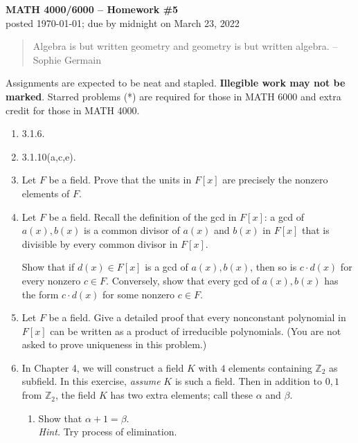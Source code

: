 \documentclass[11pt]{article}
\def\Z{\mathbb{Z}}
\theoremstyle{plain}
\theoremstyle{remark}
\begin{document}
\thispagestyle{empty} \begin{center} {\textbf{MATH 4000/6000 --
Homework \#5}\\ posted \today; due by midnight on March 23, 2022}
\end{center}

\begin{quote} {\scriptsize Algebra is but written geometry and geometry is but written algebra. -- Sophie Germain}
\end{quote}

\noindent Assignments are expected to be neat and stapled. \textbf{Illegible work may not be marked}. Starred problems (*) are required for those in MATH 6000 and extra credit for those in MATH 4000.

\vskip 0.1in
\begin{enumerate}
\item 3.1.6.

\item 3.1.10(a,c,e).



\item Let $F$ be a field. Prove that the units in $F[x]$ are precisely the nonzero elements of $F$.

\item Let $F$ be a field. Recall the definition of the gcd in $F[x]$: a gcd of $a(x), b(x)$ is a common divisor of $a(x)$ and $b(x)$ in $F[x]$ that is divisible by every common divisor in $F[x]$.

Show that if $d(x) \in F[x]$ is a gcd of $a(x), b(x)$, then so is $c \cdot d(x)$ for every nonzero $c \in F$. Conversely, show that every gcd of $a(x), b(x)$ has the form $c \cdot d(x)$ for some nonzero $c \in F$.

\item Let $F$ be a field. Give a detailed proof that every nonconstant polynomial in $F[x]$ can be written as a product of irreducible polynomials. (You are not asked to prove uniqueness in this problem.)


\item In Chapter 4, we will construct a field $K$ with $4$ elements containing $\Z_2$ as subfield. In this exercise, \emph{assume} $K$ is such a field. Then in addition to $0,1$ from $\Z_2$, the field $K$ has two extra elements; call these $\alpha$ and $\beta$.
\begin{enumerate}
\item Show that $\alpha+1 = \beta$.\\
{\scriptsize \emph{Hint.} Try process of elimination.}


\end{enumerate}
\end{enumerate}
\end{document}
